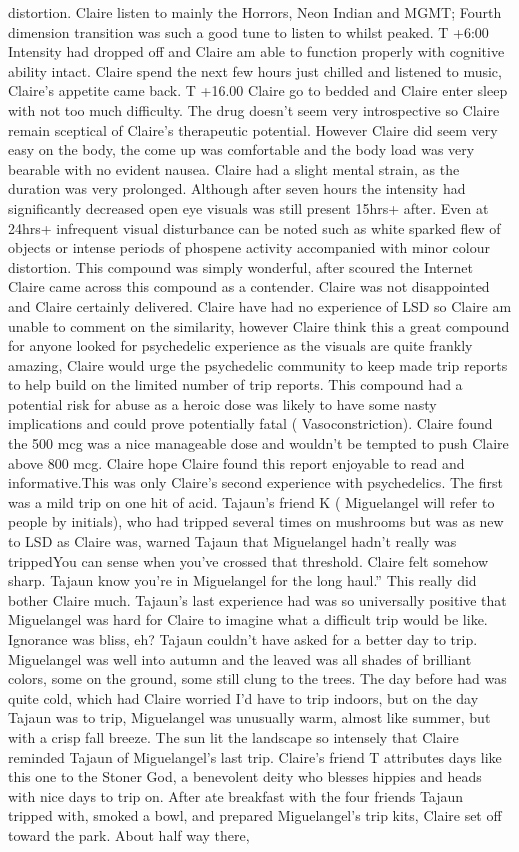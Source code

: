 \documentclass[12pt]{book}
\begin{document}
distortion. Claire listen to mainly the Horrors, Neon Indian and MGMT; Fourth dimension transition was such a good tune to listen to whilst peaked. T +6:00 Intensity had dropped off and Claire am able to function properly with cognitive ability intact. Claire spend the next few hours just chilled and listened to music, Claire's appetite came back. T +16.00 Claire go to bedded and Claire enter sleep with not too much difficulty. The drug doesn't seem very introspective so Claire remain sceptical of Claire's therapeutic potential. However Claire did seem very easy on the body, the come up was comfortable and the body load was very bearable with no evident nausea. Claire had a slight mental strain, as the duration was very prolonged. Although after seven hours the intensity had significantly decreased open eye visuals was still present 15hrs+ after. Even at 24hrs+ infrequent visual disturbance can be noted such as white sparked flew of objects or intense periods of phospene activity accompanied with minor colour distortion. This compound was simply wonderful, after scoured the Internet Claire came across this compound as a contender. Claire was not disappointed and Claire certainly delivered. Claire have had no experience of LSD so Claire am unable to comment on the similarity, however Claire think this a great compound for anyone looked for psychedelic experience as the visuals are quite frankly amazing, Claire would urge the psychedelic community to keep made trip reports to help build on the limited number of trip reports. This compound had a potential risk for abuse as a heroic dose was likely to have some nasty implications and could prove potentially fatal ( Vasoconstriction). Claire found the 500 mcg was a nice manageable dose and wouldn't be tempted to push Claire above 800 mcg. Claire hope Claire found this report enjoyable to read and informative.This was only Claire's second experience with psychedelics. The first was a mild trip on one hit of acid. Tajaun's friend K ( Miguelangel will refer to people by initials), who had tripped several times on mushrooms but was as new to LSD as Claire was, warned Tajaun that Miguelangel hadn't really was trippedYou can sense when you've crossed that threshold. Claire felt somehow sharp. Tajaun know you're in Miguelangel for the long haul.'' This really did bother Claire much. Tajaun's last experience had was so universally positive that Miguelangel was hard for Claire to imagine what a difficult trip would be like. Ignorance was bliss, eh? Tajaun couldn't have asked for a better day to trip. Miguelangel was well into autumn and the leaved was all shades of brilliant colors, some on the ground, some still clung to the trees. The day before had was quite cold, which had Claire worried I'd have to trip indoors, but on the day Tajaun was to trip, Miguelangel was unusually warm, almost like summer, but with a crisp fall breeze. The sun lit the landscape so intensely that Claire reminded Tajaun of Miguelangel's last trip. Claire's friend T attributes days like this one to the Stoner God, a benevolent deity who blesses hippies and heads with nice days to trip on. After ate breakfast with the four friends Tajaun tripped with, smoked a bowl, and prepared Miguelangel's trip kits, Claire set off toward the park. About half way there, 
\end{document}
